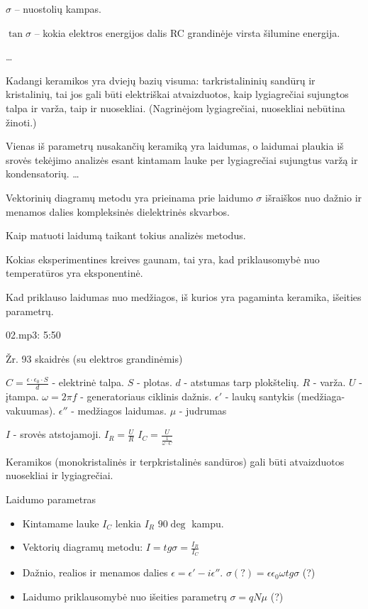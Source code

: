 $\sigma$ – nuostolių kampas.

$\tan \sigma$ – kokia elektros energijos dalis RC grandinėje virsta
šilumine energija.

…

\begin{remember}
  \item Kadangi keramikos yra dviejų bazių visuma: tarkristalininių
    sandūrų ir kristalinių, tai jos gali būti elektriškai atvaizduotos,
    kaip lygiagrečiai sujungtos talpa ir varža, taip ir nuosekliai.
    (Nagrinėjom lygiagrečiai, nuosekliai nebūtina žinoti.)
  \item Vienas iš parametrų nusakančių keramiką yra laidumas, o laidumai
    plaukia iš srovės tekėjimo analizės esant kintamam lauke per
    lygiagrečiai sujungtus varžą ir kondensatorių. …
  \item Vektorinių diagramų metodu yra prieinama prie laidumo
    $\sigma$ išraiškos nuo dažnio ir menamos dalies kompleksinės
    dielektrinės skvarbos.
  \item Kaip matuoti laidumą taikant tokius analizės metodus.
  \item Kokias eksperimentines kreives gaunam, tai yra, kad
    priklausomybė nuo temperatūros yra eksponentinė.
  \item Kad priklauso laidumas nuo medžiagos, iš kurios yra pagaminta
    keramika, išeities parametrų.
\end{remember}


02.mp3: 5:50


Žr. 93 skaidrės (su elektros grandinėmis)

$C = \frac{\epsilon \cdot \epsilon_0 \cdot S}{d}$ - elektrinė talpa.
$S$ - plotas.
$d$ - atstumas tarp plokštelių.
$R$ - varža.
$U$ - įtampa.
$\omega = 2 \pi f$ - generatoriaus ciklinis dažnis.
$\epsilon'$ - laukų santykis (medžiaga-vakuumas).
$\epsilon''$ - medžiagos laidumas.
$\mu$ - judrumas

$I$ - srovės atstojamoji.
$I_R = \frac{U}{R}$
$I_C = \frac{U}{\frac{1}{\omega \cdot C}}$

\begin{remember}
  \item Keramikos (monokristalinės ir terpkristalinės sandūros) gali
  būti atvaizduotos nuosekliai ir lygiagrečiai.
  \item Laidumo parametras\begin{itemize}
    \item Kintamame lauke $I_C$ lenkia $I_R$ $90\deg$ kampu.
    \item Vektorių diagramų metodu: $I = tg \sigma = \frac{I_R}{I_C}$
    \item Dažnio, realios ir menamos dalies
    $\epsilon = \epsilon' - i\epsilon''$.
    $\sigma (?) = \epsilon \epsilon_0 \omega tg \sigma$ (?)
    \item Laidumo priklausomybė nuo išeities parametrų
    $\sigma = qN\mu$ (?)
  \end{itemize}
\end{remember}

